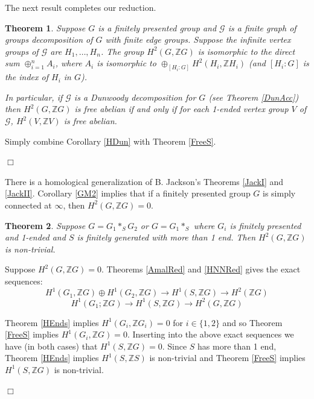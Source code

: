\documentclass[12pt]{article}
\newtheorem{theorem}{Theorem}[subsection]
\newenvironment{proof}{\addvspace{12pt}\noindent{\bf Proof:}}{
$\Box$\par\addvspace{12pt}}
\begin{document}

The next result completes our reduction.

\begin{theorem}\label{Reduction} 
Suppose $G$ is a finitely presented group and $\mathcal G$ is a finite graph of groups decomposition of $G$ with finite edge groups. Suppose the infinite vertex groups of $\mathcal G$ are $H_1, \ldots, H_n$. The group $H^2(G,\mathbb ZG)$ is isomorphic to the direct sum $\oplus_{i=1}^nA_i$, where $A_i$ is isomorphic to $\oplus _{[H_i:G]}H^2(H_i,\mathbb ZH_i)$ (and $[H_i:G]$ is the index of $H_i$ in $G$). 



In particular, if $\mathcal G$ is a Dunwoody decomposition for $G$ (see Theorem \ref{DunAcc}) then $H^2(G,\mathbb ZG)$ is free abelian if and only if  for each 1-ended vertex group $V$ of $\mathcal G$, $H^2(V,\mathbb ZV)$ is free abelian.
\end{theorem}
\begin{proof}
Simply combine Corollary \ref{HDun} with Theorem \ref{FreeS}.
\end{proof}
 
There is a homological generalization of B. Jackson's  Theorems \ref{JackI} and \ref{JackII}. Corollary \ref{GM2} implies that if a finitely presented group $G$ is simply connected at $\infty$, then $H^2(G,\mathbb ZG)=0$. 

\begin{theorem} \label{JHom} 
Suppose $G=G_1\ast_SG_2$ or $G=G_1\ast_S$ where $G_i$ is finitely presented and 1-ended and $S$ is finitely generated with more than 1 end. Then $H^2(G, \mathbb ZG)$ is non-trivial. 
\end{theorem}
 \begin{proof}
Suppose $H^2(G,\mathbb ZG)=0$.  Theorems \ref{AmalRed} and \ref{HNNRed} gives the exact sequences:
 $$H^1(G_1,\mathbb ZG)\oplus H^1(G_2,\mathbb ZG)\to H^1(S,\mathbb ZG)\to H^2(\mathbb ZG)$$
 $$H^1(G_1;\mathbb ZG)\to H^1(S,\mathbb ZG)\to H^2(G,\mathbb ZG)$$
 
 Theorem \ref{HEnds} implies $H^1(G_i,\mathbb ZG_i)=0$ for $i\in \{1,2\}$ and so Theorem \ref{FreeS} implies $H^1(G_i,\mathbb ZG)=0$. Inserting into the above exact sequences we have (in both cases) that $H^1(S,\mathbb ZG)=0$. Since $S$ has more than 1 end, Theorem \ref{HEnds} implies $H^1(S, \mathbb ZS)$ is non-trivial and Theorem \ref{FreeS} implies $H^1(S,\mathbb ZG)$ is non-trivial. 
 \end{proof}
\end{document}
